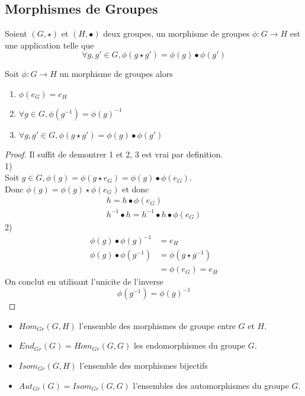 \documentclass[../main.tex]{subfiles}
\begin{document}
\subsection{Morphismes de Groupes}
\begin{defn}\label{defn:morphisme_de_groupe}
	Soient $(G,\star)$ et $(H,\bullet)$ deux groupes, un morphisme de groupes $\phi: G \to H$ est une application telle que
	\[ 
		\forall g,g'\in G, \phi(g\star g')=\phi(g) \bullet \phi(g')
	\]
\end{defn}
\begin{thm}
Soit $\phi: G\to H$ un morphisme de groupes alors
\begin{enumerate}
	\item $\phi(e_G)= e_H$
	\item $\forall g \in G, \phi(g^{-1})=\phi(g)^{-1}$
	\item $\forall g,g' \in G, \phi(g\star g') = \phi(g) \bullet\phi(g')$
\end{enumerate}
\end{thm}
\begin{proof}
Il suffit de demontrer 1 et 2, 3 est vrai par definition.\\
1)\\
Soit $g\in G,\phi(g)=\phi(g\star e_G)= \phi(g) \bullet \phi(e_G)$.\\
Donc $\phi(g) = \phi(g) \star\phi(e_G)$ et donc
\begin{align*}
h = h\bullet \phi(e_G)\\
h^{-1}\bullet h = h^{-1}\bullet h \bullet \phi(e_G)
\end{align*}
2)\\
 
\begin{align*}
	\phi(g) \bullet \phi(g)^{-1} &= e_H\\
	\phi(g) \bullet \phi(g^{-1}) &= \phi(g\star g^{-1})\\
				     &= \phi(e_G) = e_H
\end{align*}
On conclut en utilisant l'unicite de l'inverse
\[ 
	\phi(g^{-1})=\phi(g)^{-1}
\]



 

\end{proof}
\begin{defn}[Notations]
\begin{itemize}
	\item $Hom_{Gr} (G,H)$ l'ensemble des morphismes de groupe entre $G$ et $H$.
	\item $End_{Gr} (G) = Hom _{Gr} ( G,G)$ les endomorphismes du groupe $G$.
	\item $Isom_{Gr} ( G,H)$ l'ensemble des morphismes bijectifs
	\item $Aut_{Gr} ( G)= Isom_{Gr} ( G,G)$ l'ensembles des automorphismes du groupe $G$.
\end{itemize}
\end{defn}
\end{document}
